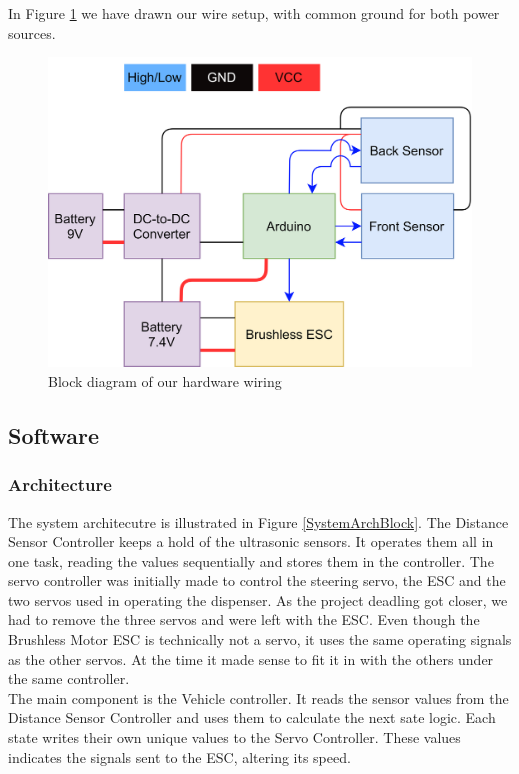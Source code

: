 \documentclass{article}
\begin{document}
In Figure \ref{Hardware} we have drawn our wire setup, with common ground for both power sources.
\begin{figure}[H]
  \centering
  \includegraphics[width=\linewidth]{hardware.png}
  \caption{Block diagram of our hardware wiring}
  \label{Hardware}
\end{figure}

\subsection{Software}

\subsubsection{Architecture}
The system architecutre is illustrated in Figure \ref{SystemArchBlock}. The Distance Sensor Controller keeps a hold of the ultrasonic sensors. It operates them all in one task, reading the values sequentially and stores them in the controller. The servo controller was initially made to control the steering servo, the ESC and the two servos used in operating the dispenser. As the project deadling got closer, we had to remove the three servos and were left with the ESC. Even though the Brushless Motor ESC is technically not a servo, it uses the same operating signals as the other servos. At the time it made sense to fit it in with the others under the same controller.\\

The main component is the Vehicle controller. It reads the sensor values from the Distance Sensor Controller and uses them to calculate the next sate logic. Each state writes their own unique values to the Servo Controller. These values indicates the signals sent to the ESC, altering its speed.
\end{document}
